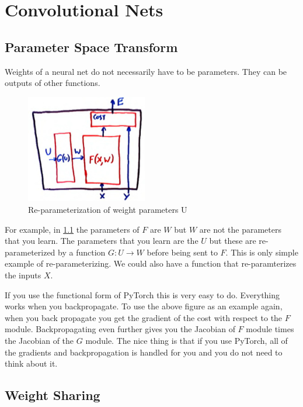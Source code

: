 \chapter{Convolutional Nets}

\section{Parameter Space Transform}

Weights of a neural net do not necessarily have to be parameters. 
They can be outputs of other functions.

\begin{figure}
    \centering
    \includegraphics[width=150pt]{figs/parameterize.png}
    \caption{Re-parameterization of weight parameters U}
    \label{fig:param}
\end{figure}

For example, in \cref{fig:param} the parameters of $F$ are $W$ but $W$ are not the parameters that you learn. 
The parameters that you learn are the $U$ but these are re-parameterized by a function $G:U\rightarrow W$ before being sent to $F$. 
This is only simple example of re-parameterizing. 
We could also have a function that re-paramterizes the inputs $X$.

If you use the functional form of PyTorch this is very easy to do. 
Everything works when you backpropagate. 
To use the above figure as an example again, when you back propagate you get the gradient of the cost with respect to the $F$ module. 
Backpropagating even further gives you the Jacobian of $F$ module times the Jacobian of the $G$ module. 
The nice thing is that if you use PyTorch, all of the gradients and backpropagation is handled for you and you do not need to think about it. 

\section{Weight Sharing}

